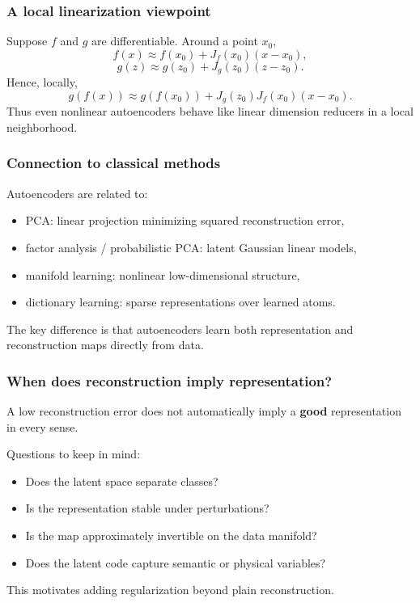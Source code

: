 \documentclass{beamer}
\begin{document}
\begin{frame}
\frametitle{A local linearization viewpoint}

Suppose \(f\) and \(g\) are differentiable. Around a point \(x_0\),
\[
f(x) \approx f(x_0) + J_f(x_0)(x-x_0),
\]
\[
g(z) \approx g(z_0) + J_g(z_0)(z-z_0).
\]
Hence, locally,
\[
g(f(x)) \approx g(f(x_0)) + J_g(z_0)J_f(x_0)(x-x_0).
\]
Thus even nonlinear autoencoders behave like linear dimension reducers in a local neighborhood.
\end{frame}

\begin{frame}
\frametitle{Connection to classical methods}

\begin{block}{Autoencoders are related to: }
\begin{itemize}
\item PCA: linear projection minimizing squared reconstruction error,

\item factor analysis / probabilistic PCA: latent Gaussian linear models,

\item manifold learning: nonlinear low-dimensional structure,

\item dictionary learning: sparse representations over learned atoms.
\end{itemize}

\noindent
\end{block}
The key difference is that autoencoders learn both representation and reconstruction maps directly from data.
\end{frame}

\begin{frame}
\frametitle{When does reconstruction imply representation?}

A low reconstruction error does not automatically imply a \textbf{good} representation in every sense.

\begin{block}{Questions to keep in mind: }
\begin{itemize}
\item Does the latent space separate classes?

\item Is the representation stable under perturbations?

\item Is the map approximately invertible on the data manifold?

\item Does the latent code capture semantic or physical variables?
\end{itemize}

\noindent
\end{block}
This motivates adding regularization beyond plain reconstruction.
\end{frame}
\end{document}
